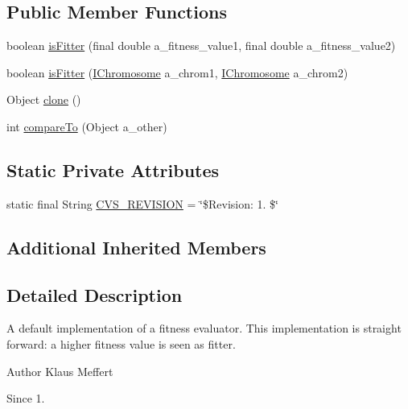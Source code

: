 \subsection*{Public Member Functions}
\begin{DoxyCompactItemize}
\item 
boolean \hyperlink{classorg_1_1jgap_1_1_default_fitness_evaluator_afbb45012eb092973d3eff80766e00d5a}{is\-Fitter} (final double a\-\_\-fitness\-\_\-value1, final double a\-\_\-fitness\-\_\-value2)
\item 
boolean \hyperlink{classorg_1_1jgap_1_1_default_fitness_evaluator_a6a1e94d08736c1eca97c91a19bfbeb64}{is\-Fitter} (\hyperlink{interfaceorg_1_1jgap_1_1_i_chromosome}{I\-Chromosome} a\-\_\-chrom1, \hyperlink{interfaceorg_1_1jgap_1_1_i_chromosome}{I\-Chromosome} a\-\_\-chrom2)
\item 
Object \hyperlink{classorg_1_1jgap_1_1_default_fitness_evaluator_abfc0627c45ff61f3e340ec9ba75c4ace}{clone} ()
\item 
int \hyperlink{classorg_1_1jgap_1_1_default_fitness_evaluator_a0ded003beea4e428a17a44842fc65420}{compare\-To} (Object a\-\_\-other)
\end{DoxyCompactItemize}
\subsection*{Static Private Attributes}
\begin{DoxyCompactItemize}
\item 
static final String \hyperlink{classorg_1_1jgap_1_1_default_fitness_evaluator_aecf1f7b9b57f152c923269eba1fc7171}{C\-V\-S\-\_\-\-R\-E\-V\-I\-S\-I\-O\-N} = \char`\"{}\$Revision\-: 1. \$\char`\"{}
\end{DoxyCompactItemize}
\subsection*{Additional Inherited Members}


\subsection{Detailed Description}
A default implementation of a fitness evaluator. This implementation is straight forward\-: a higher fitness value is seen as fitter.

\begin{DoxyAuthor}{Author}
Klaus Meffert 
\end{DoxyAuthor}
\begin{DoxySince}{Since}
1. 
\end{DoxySince}


